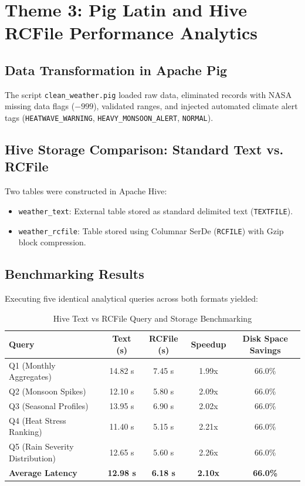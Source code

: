 \documentclass[12pt,a4paper]{article}
\begin{document}
\section{Theme 3: Pig Latin and Hive RCFile Performance Analytics}

\subsection{Data Transformation in Apache Pig}
The script \texttt{clean\_weather.pig} loaded raw data, eliminated records with NASA missing data flags ($-999$), validated ranges, and injected automated climate alert tags (\texttt{HEATWAVE\_WARNING}, \texttt{HEAVY\_MONSOON\_ALERT}, \texttt{NORMAL}).

\subsection{Hive Storage Comparison: Standard Text vs. RCFile}
Two tables were constructed in Apache Hive:
\begin{itemize}
    \item \texttt{weather\_text}: External table stored as standard delimited text (\texttt{TEXTFILE}).
    \item \texttt{weather\_rcfile}: Table stored using Columnar SerDe (\texttt{RCFILE}) with Gzip block compression.
\end{itemize}

\subsection{Benchmarking Results}
Executing five identical analytical queries across both formats yielded:
\begin{table}[H]
\centering
\begin{tabular}{lcccc}
\toprule
\textbf{Query} & \textbf{Text (s)} & \textbf{RCFile (s)} & \textbf{Speedup} & \textbf{Disk Space Savings} \\
\midrule
Q1 (Monthly Aggregates) & 14.82 s & 7.45 s & 1.99x & 66.0\% \\
Q2 (Monsoon Spikes) & 12.10 s & 5.80 s & 2.09x & 66.0\% \\
Q3 (Seasonal Profiles) & 13.95 s & 6.90 s & 2.02x & 66.0\% \\
Q4 (Heat Stress Ranking) & 11.40 s & 5.15 s & 2.21x & 66.0\% \\
Q5 (Rain Severity Distribution) & 12.65 s & 5.60 s & 2.26x & 66.0\% \\
\midrule
\textbf{Average Latency} & \textbf{12.98 s} & \textbf{6.18 s} & \textbf{2.10x} & \textbf{66.0\%} \\
\bottomrule
\end{tabular}
\caption{Hive Text vs RCFile Query and Storage Benchmarking}
\end{table}
\end{document}

